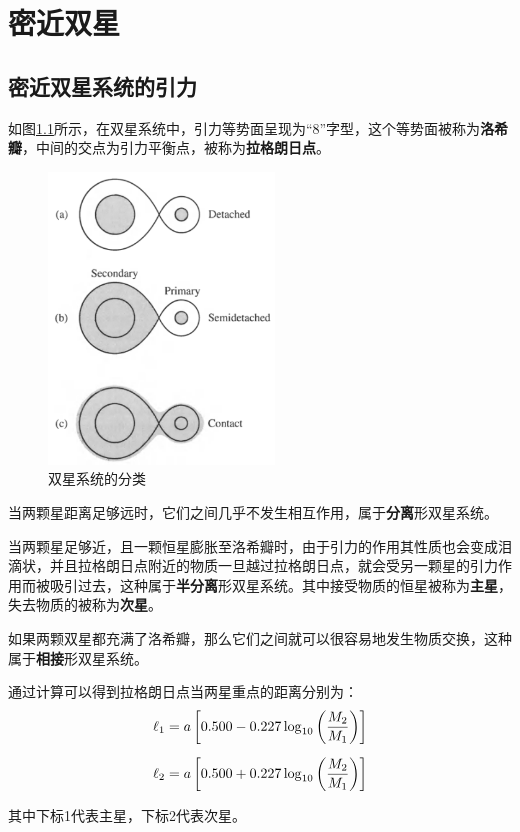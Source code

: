 \chapter{密近双星}
\section{密近双星系统的引力}
如图\ref{fig:binary}所示，在双星系统中，引力等势面呈现为``8''字型，这个等势面被称为\textbf{洛希瓣}，中间的交点为引力平衡点，被称为\textbf{拉格朗日点}。

\begin{figure}[hbt]
  \centering
  \includegraphics[width=6cm]{chapters/18/binary}
  \caption{双星系统的分类}
  \label{fig:binary}
\end{figure}

当两颗星距离足够远时，它们之间几乎不发生相互作用，属于\textbf{分离}形双星系统。

当两颗星足够近，且一颗恒星膨胀至洛希瓣时，由于引力的作用其性质也会变成泪滴状，并且拉格朗日点附近的物质一旦越过拉格朗日点，就会受另一颗星的引力作用而被吸引过去，这种属于\textbf{半分离}形双星系统。其中接受物质的恒星被称为\textbf{主星}，失去物质的被称为\textbf{次星}。

如果两颗双星都充满了洛希瓣，那么它们之间就可以很容易地发生物质交换，这种属于\textbf{相接}形双星系统。

通过计算可以得到拉格朗日点当两星重点的距离分别为：
\begin{align}
  \ell_1 &=a\left[0.500-0.227\log_{10}\left({M_2\over M_1}\right)\right]\\[2mm]
  \ell_2 &=a\left[0.500+0.227\log_{10}\left({M_2\over M_1}\right)\right]
\end{align}

其中下标1代表主星，下标2代表次星。

